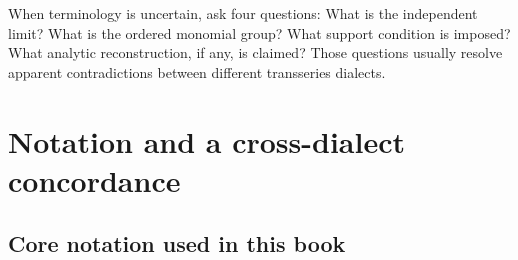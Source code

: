 \documentclass[11pt,openany]{book}
\theoremstyle{definition}
\theoremstyle{plain}
\theoremstyle{remark}
\begin{document}
\begin{summarybox}
When terminology is uncertain, ask four questions: What is the independent
limit? What is the ordered monomial group? What support condition is imposed?
What analytic reconstruction, if any, is claimed? Those questions usually
resolve apparent contradictions between different transseries dialects.
\end{summarybox}


\chapter{Notation and a cross-dialect concordance}\label{app:notation}

\section{Core notation used in this book}
\end{document}
